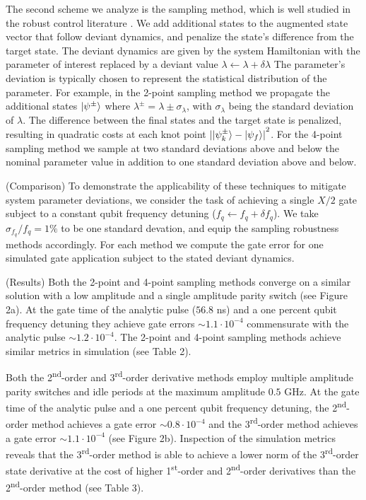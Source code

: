\documentclass[
  amsfonts,
  amsmath,
  tbtags,
  amssymb,
  aps,
  nobibnotes,
  twocolumn,
  superscriptaddress,
]{revtex4-2}
\begin{document}
The second scheme we analyze is the sampling method,
which is well studied in the robust control literature
\cite{manchester2016derivative} \cite{tronarp2016sigma}.
We add additional
states to the augmented state vector that follow deviant dynamics, and
penalize the state's difference from the target state.
The deviant dynamics are given by the system
Hamiltonian with the parameter of interest replaced by
a deviant value $\lambda \gets \lambda + \delta \lambda$
The parameter's deviation is typically chosen
to represent the statistical distribution of the parameter.
For example, in the 2-point sampling method we
propagate the additional states $\ket{\psi^{\pm}}$ where
$\lambda^{\pm} = \lambda \pm \sigma_{\lambda}$, with
$\sigma_{\lambda}$ being the standard deviation of $\lambda$.
The difference between the final states and the target
state is penalized, resulting in quadratic costs at
each knot point
${\lvert \ket{\psi^{\pm}_{k}} - \ket{\psi_{f}} \rvert}^{2}$.
For the 4-point sampling method we sample at two standard deviations
above and below the nominal parameter value in addition to one standard
deviation above and below.

(Comparison) To demonstrate the applicability of these techniques
to mitigate system parameter deviations,
we consider the task of achieving a single $X/2$
gate subject to a constant qubit frequency detuning
($f_{q} \gets f_{q} + \delta f_{q}$).
We take $\sigma_{f_{q}} / f_{q} = 1\%$ to be one standard devation, and equip
the sampling robustness methods accordingly.
For each method we compute the gate error for one simulated gate application
subject to the stated deviant dynamics.

(Results) Both the 2-point and 4-point
sampling methods converge on a similar solution with a low amplitude and
a single amplitude parity switch (see Figure 2a). At the gate time of the analytic pulse
($56.8$ ns) and a one percent qubit frequency detuning they achieve
gate errors $\sim 1.1 \cdot 10^{-4}$ commensurate with the analytic
pulse $\sim 1.2 \cdot 10^{-4}$. The 2-point and 4-point sampling methods
achieve similar metrics in simulation (see Table 2).

Both the 2\textsuperscript{nd}-order and 3\textsuperscript{rd}-order derivative methods
employ multiple amplitude parity switches and idle periods at the maximum
amplitude $0.5$ GHz. At the gate time of the analytic pulse and a one percent qubit
frequency detuning, the 2\textsuperscript{nd}-order method achieves a gate error
$\sim 0.8 \cdot 10^{-4}$ and the 3\textsuperscript{rd}-order method achieves a gate error
$\sim 1.1 \cdot 10^{-4}$ (see Figure 2b). Inspection of the simulation metrics reveals
that the 3\textsuperscript{rd}-order method is able to achieve a lower norm of the
3\textsuperscript{rd}-order state derivative at the cost of higher 1\textsuperscript{st}-order
and 2\textsuperscript{nd}-order derivatives than the 2\textsuperscript{nd}-order method (see Table 3).
\end{document}
